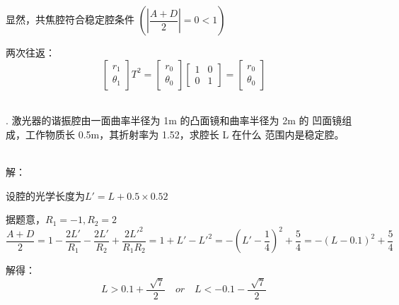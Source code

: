 \documentclass[12pt]{article}
\begin{document}
{\newpage 
\par 显然，共焦腔符合稳定腔条件 $\left( \left| \dfrac{A+D}{2}  \right|=0<1 \right)$
\par 两次往返：
\begin{equation*}
	\begin{bmatrix}
		r_1 \\ \theta_1
	\end{bmatrix}
	T^2=
	\begin{bmatrix}
		r_0 \\ \theta_0
	\end{bmatrix}
	\begin{bmatrix}
		1 & 0 \\
		0 & 1
	\end{bmatrix}
	=
	\begin{bmatrix}
		r_0 \\ \theta_0
	\end{bmatrix}
\end{equation*}
\\}

{. 激光器的谐振腔由一面曲率半径为 1m 的凸面镜和曲率半径为 2m 的
凹面镜组成，工作物质长 0.5m，其折射率为 1.52，求腔长 L 在什么
范围内是稳定腔。
}
{\kaishu\noindent
\\解：
\par 设腔的光学长度为$L'=L+0.5 \times 0.52$
\par 据题意，$R_1=-1,R_2=2$
\[
	\frac{A+D}{2} 
	=1-\frac{2L'}{R_1} -\frac{2L'}{R_2} +\frac{2L'^2}{R_1R_2} 
	=1+L'-L'^2
	=-(L'-\frac{1}{4})^2+\frac{5}{4}  
	=-(L-0.1)^2+\frac{5}{4}  
\]
\par 解得：
\[
	L>0.1+\frac{\sqrt[]{7}}{2}\quad or\quad L<-0.1-\frac{\sqrt[]{7}}{2} 
\]
\\}
\end{document}
